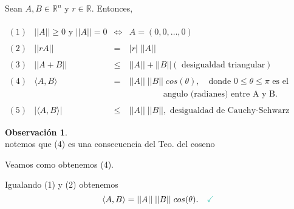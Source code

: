 \documentclass{article}
\theoremstyle{definition}
\newtheorem*{obs}{Observación}
\theoremstyle{remark}
\newcommand\ok{\checkmark}
\begin{document}
\begin{teo}
  Sean $A,B \in \mathbb{R}^n$ y $r \in \mathbb{R}$. Entonces,\\\\ $\begin{array}{llcl}
    (1) & ||A|| \geq 0 \text{ y } ||A||=0 & \Leftrightarrow & A=(0,0,\dots,0) \\ \\
    (2) & ||rA|| & = &  |r|\; ||A|| \\\\
    (3) & ||A+B|| & \leq & ||A|| + ||B|| (\text{ desigualdad triangular}) \\\\
  (4) & \langle A,B \rangle & = & ||A||\; ||B|| \; cos(\theta), \quad  \text{donde } 0 \leq \theta \leq \pi \text{ es el}\\ & & & \quad \quad \quad \quad \text{angulo (radianes) entre A y B}.\\\\
  (5) & |\langle A,B \rangle| & \leq & ||A||\; ||B||,  \text{ desigualdad de Cauchy-Schwarz}
  \end{array}$
\end{teo}
\pagebreak 
\begin{obs} \; \\
  notemos que (4) es una consecuencia del Teo. del coseno 

\end{obs}

\begin{figure}[h]
\centering
\def\svgwidth{0.75\textwidth}

\end{figure}

Veamos como obtenemos (4).

\begin{figure}[h]
\centering
\def\svgwidth{1\textwidth}

\end{figure}

Igualando \textcolor{azulp2}{(1)} y \textcolor{azulp2}{(2)} obtenemos 
\[
  \langle A,B \rangle = ||A|| \; ||B|| \; cos(\theta). \quad \textcolor{verdep2}{\ok}
\] 
\end{document}
